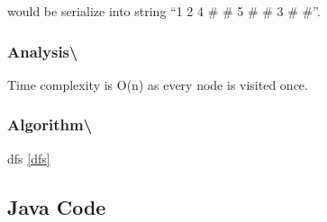 \documentclass[]{book}
\begin{document}
would be serialize into string ``1 2 4 \# \# 5 \# \# 3 \# \#''.

\hypertarget{analysis-92}{%
\subsubsection{Analysis\textbackslash{}}\label{analysis-92}}

Time complexity is O(n) as every node is visited once.

\hypertarget{algorithm-93}{%
\subsubsection{Algorithm\textbackslash{}}\label{algorithm-93}}

dfs \ref{dfs}

\hypertarget{java-code-55}{%
\subsection{Java Code}\label{java-code-55}}
\end{document}
